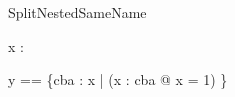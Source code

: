 \begin{zsection}
  \SECTION SplitNestedSameName
\end{zsection}

\begin{axdef}
  x : \power\power\arithmos
\end{axdef}

\begin{axdef}
  y == \{cba : x | (\forall x : cba @ x = 1) \}
\end{axdef}
